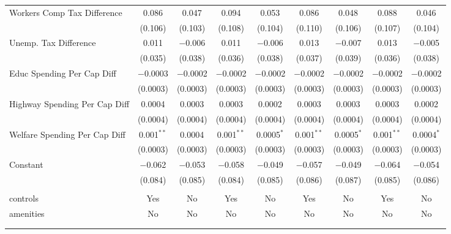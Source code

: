 \begin{table}[!htbp]
\begin{tabular}{@{\extracolsep{5pt}}lcccccccc}
  Workers Comp Tax Difference & 0.086 & 0.047 & 0.094 & 0.053 & 0.086 & 0.048 & 0.088 & 0.046 \\ 
  & (0.106) & (0.103) & (0.108) & (0.104) & (0.110) & (0.106) & (0.107) & (0.104) \\ 
  Unemp. Tax Difference & 0.011 & $-$0.006 & 0.011 & $-$0.006 & 0.013 & $-$0.007 & 0.013 & $-$0.005 \\ 
  & (0.035) & (0.038) & (0.036) & (0.038) & (0.037) & (0.039) & (0.036) & (0.038) \\ 
  Educ Spending Per Cap Diff & $-$0.0003 & $-$0.0002 & $-$0.0002 & $-$0.0002 & $-$0.0002 & $-$0.0002 & $-$0.0002 & $-$0.0002 \\ 
  & (0.0003) & (0.0003) & (0.0003) & (0.0003) & (0.0003) & (0.0003) & (0.0003) & (0.0003) \\ 
  Highway Spending Per Cap Diff & 0.0004 & 0.0003 & 0.0003 & 0.0002 & 0.0003 & 0.0003 & 0.0003 & 0.0002 \\ 
  & (0.0004) & (0.0004) & (0.0004) & (0.0004) & (0.0004) & (0.0004) & (0.0004) & (0.0004) \\ 
  Welfare Spending Per Cap Diff & 0.001$^{**}$ & 0.0004 & 0.001$^{**}$ & 0.0005$^{*}$ & 0.001$^{**}$ & 0.0005$^{*}$ & 0.001$^{**}$ & 0.0004$^{*}$ \\ 
  & (0.0003) & (0.0003) & (0.0003) & (0.0003) & (0.0003) & (0.0003) & (0.0003) & (0.0003) \\ 
  Constant & $-$0.062 & $-$0.053 & $-$0.058 & $-$0.049 & $-$0.057 & $-$0.049 & $-$0.064 & $-$0.054 \\ 
  & (0.084) & (0.085) & (0.084) & (0.085) & (0.086) & (0.087) & (0.085) & (0.086) \\ 
 \hline \\[-1.8ex] 
controls & Yes & No & Yes & No & Yes & No & Yes & No \\ 
amenities & No & No & No & No & No & No & No & No \\ 
\hline \\[-1.8ex] 
\hline 
\hline \\[-1.8ex] 
\end{tabular} 
\end{table} 
